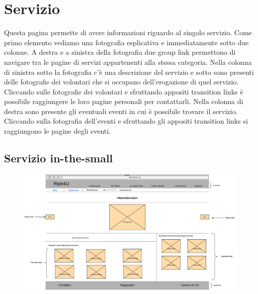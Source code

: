     \section{Servizio}    
    Questa pagina permette di avere informazioni riguardo al singolo servizio.
    Come primo elemento vediamo una fotografia esplicativa e immediatamente
    sotto due colonne. A destra e a sinistra della fotografia due group link
    permettono di navigare tra le pagine di servizi appartenenti alla stessa
    categoria. Nella colonna di sinistra sotto la fotografia c'è una descrizione
    del servizio e sotto sono presenti delle fotografie dei volontari che si
    occupano dell'erogazione di quel servizio. Cliccando sulle fotografie dei
    volontari e sfruttando appositi transition links è possibile raggiungere le
    loro pagine personali per contattarli. Nella colonna di destra sono presente
    gli eventuali eventi in cui è possibile trovare il servizio. Cliccando sulla
    fotografia dell'eventi e sfruttando gli appositi transition links si
    raggiungono le pagine degli eventi.

        \subsection{Servizio in-the-small}
        \begin{figure}[H]
            \centering
            \includegraphics[scale=0.37]{resources/images/servizio-in-the-small.jpg}
        \end{figure}

